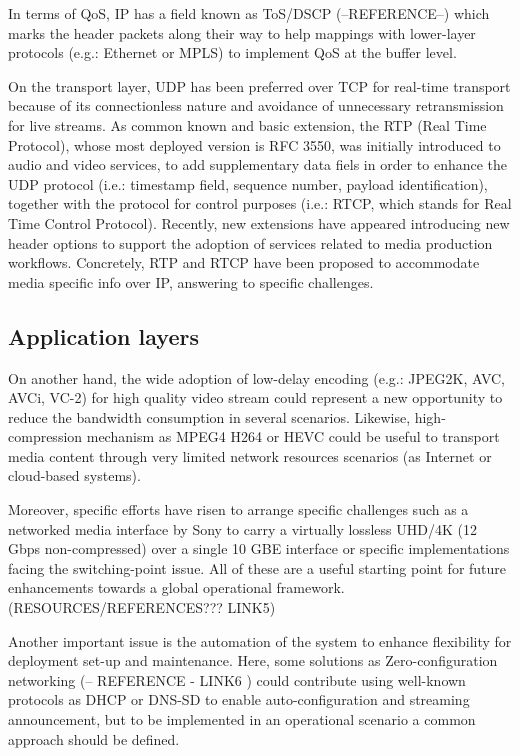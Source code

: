 In terms of QoS, IP has a field known as ToS/DSCP (--REFERENCE--) which marks the header packets along their way to help mappings with lower-layer protocols (e.g.: Ethernet or MPLS) to implement QoS at the buffer level.

On the transport layer, UDP has been preferred over TCP for real-time transport because of its connectionless nature and avoidance of unnecessary retransmission for live streams. As common known and basic extension, the RTP (Real Time Protocol), whose most deployed version is RFC 3550, was initially introduced to audio and video services, to add supplementary data fiels in order to enhance the UDP protocol (i.e.: timestamp field, sequence number, payload identification), together with the protocol for control purposes (i.e.: RTCP, which stands for Real Time Control Protocol). Recently, new extensions have appeared introducing new header options to support the adoption of services related to media production workflows. Concretely, RTP and RTCP have been proposed to accommodate media specific info over IP, answering to specific challenges.

\subsection{Application layers}\label{S:sessionPresentationApplicatio}

On another hand, the wide adoption of low-delay encoding (e.g.: JPEG2K, AVC, AVCi, VC-2) for high quality video stream could represent a new opportunity to reduce the bandwidth consumption in several scenarios. Likewise, high-compression mechanism as MPEG4 H264 or HEVC could be
useful to transport media content through very limited network resources scenarios (as Internet or cloud-based systems).

Moreover, specific efforts have risen to arrange specific challenges such as a networked media interface by Sony to carry a virtually lossless UHD/4K (12 Gbps non-compressed) over a single 10 GBE interface or specific implementations facing the switching-point issue. All of these are a useful starting point for future enhancements towards a global operational framework. (RESOURCES/REFERENCES??? LINK5)

Another important issue is the automation of the system to enhance flexibility for deployment set-up and maintenance. Here, some solutions as Zero-configuration networking (-- REFERENCE - LINK6 ) could contribute using well-known protocols as DHCP or DNS-SD to enable auto-configuration and streaming announcement, but to be implemented in an operational scenario a common approach should be defined.

